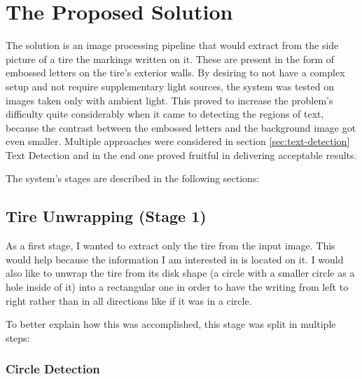 \chapter{The Proposed Solution}\pagestyle{fancy}\setlength{\parindent}{3em}
\label{chap:proposed-solution}

The solution is an image processing pipeline that would extract from the side picture of a tire the markings written on it. These are present in the form of embossed letters on the tire's exterior walls. By desiring to not have a complex setup and not require supplementary light sources, the system was tested on images taken only with ambient light. This proved to increase the problem's difficulty quite considerably when it came to detecting the regions of text, because the contrast between the embossed letters and the background image got even smaller. Multiple approaches were considered in section \ref{sec:text-detection} Text Detection and in the end one proved fruitful in delivering acceptable results.

The system's stages are described in the following sections:

\section{Tire Unwrapping (Stage 1)}\label{sec:tire-unwrapping}

As a first stage, I wanted to extract only the tire from the input image. This would help because the information I am interested in is located on it. I would also like to unwrap the tire from its disk shape (a circle with a smaller circle as a hole inside of it) into a rectangular one in order to have the writing from left to right rather than in all directions like if it was in a circle.

To better explain how this was accomplished, this stage was split in multiple steps:

\subsection{Circle Detection}

